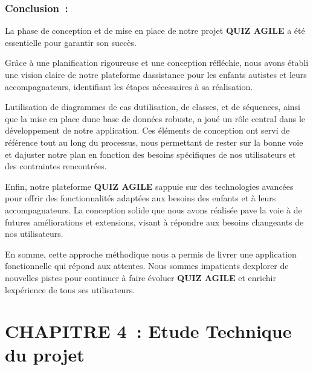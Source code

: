 \documentclass[12pt,a4paper,twoside]{report}
\begin{document}
\hypertarget{conclusion-2}{%
\subsubsection{\texorpdfstring{\textbf{Conclusion}~:}{Conclusion~:}}\label{conclusion-2}}

La phase de conception et de mise en place de notre projet \textbf{QUIZ
AGILE} a été essentielle pour garantir son succès.

Grâce à une planification rigoureuse et une conception réfléchie, nous
avons établi une vision claire de notre plateforme
d\textquotesingle assistance pour les enfants autistes et leurs
accompagnateurs, identifiant les étapes nécessaires à sa réalisation.

L\textquotesingle utilisation de diagrammes de cas
d\textquotesingle utilisation, de classes, et de séquences, ainsi que la
mise en place d\textquotesingle une base de données robuste, a joué un
rôle central dans le développement de notre application. Ces éléments de
conception ont servi de référence tout au long du processus, nous
permettant de rester sur la bonne voie et d\textquotesingle ajuster
notre plan en fonction des besoins spécifiques de nos utilisateurs et
des contraintes rencontrées.

Enfin, notre plateforme \textbf{QUIZ AGILE} s\textquotesingle appuie sur
des technologies avancées pour offrir des fonctionnalités adaptées aux
besoins des enfants et à leurs accompagnateurs. La conception solide que
nous avons réalisée pave la voie à de futures améliorations et
extensions, visant à répondre aux besoins changeants de nos
utilisateurs.

En somme, cette approche méthodique nous a permis de livrer une
application fonctionnelle qui répond aux attentes. Nous sommes
impatients d\textquotesingle explorer de nouvelles pistes pour continuer
à faire évoluer \textbf{QUIZ AGILE} et enrichir
l\textquotesingle expérience de tous ses utilisateurs.

\hypertarget{section-5}{%
\section{}\label{section-5}}

\hypertarget{chapitre-4-etude-technique-du-projet}{%
\section{CHAPITRE 4~: Etude Technique du
projet}\label{chapitre-4-etude-technique-du-projet}}
\end{document}
